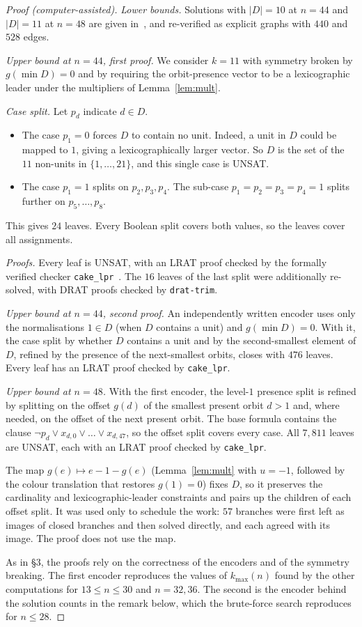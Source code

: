 \documentclass[11pt]{amsart}
\theoremstyle{definition}
\newcommand{\kmax}{k_{\max}}
\begin{document}
\begin{proof}[Proof (computer-assisted)]
\emph{Lower bounds.} Solutions with $|D|=10$ at $n=44$ and $|D|=11$ at $n=48$ are given
in~\cite{Repo}, and re-verified as explicit graphs with $440$ and $528$ edges.

\emph{Upper bound at $n=44$, first proof.} We consider $k=11$ with symmetry broken by $g(\min D)=0$ and by requiring the
orbit-presence vector to be a lexicographic leader under the multipliers of
Lemma~\ref{lem:mult}.

\emph{Case split.} Let $p_d$ indicate $d\in D$.
\begin{itemize}
\item The case $p_1=0$ forces $D$ to contain no unit. Indeed, a unit in $D$ could be mapped to
  $1$, giving a lexicographically larger vector. So $D$ is the set of the $11$ non-units in
  $\{1,\dots,21\}$, and this single case is UNSAT.
\item The case $p_1=1$ splits on $p_2,p_3,p_4$. The sub-case $p_1=p_2=p_3=p_4=1$ splits further
  on $p_5,\dots,p_8$.
\end{itemize}
This gives $24$ leaves. Every Boolean split covers both values, so the leaves cover all
assignments.

\emph{Proofs.} Every leaf is UNSAT, with an LRAT proof checked by the formally verified
checker \texttt{cake\_lpr}~\cite{cakelpr}. The $16$ leaves of the last split were additionally
re-solved, with DRAT proofs checked by \texttt{drat-trim}.

\emph{Upper bound at $n=44$, second proof.} An independently written encoder uses only the
normalisations $1\in D$ (when $D$ contains a unit) and $g(\min D)=0$. With it, the case
split by whether $D$ contains a unit and by the second-smallest element of $D$, refined by
the presence of the next-smallest orbits, closes with $476$ leaves. Every leaf has an LRAT
proof checked by \texttt{cake\_lpr}.

\emph{Upper bound at $n=48$.} With the first encoder, the level-$1$ presence split is refined
by splitting on the offset $g(d)$ of the smallest present orbit $d>1$ and, where needed, on
the offset of the next present orbit. The base formula contains the clause
$\neg p_d\vee x_{d,0}\vee\dots\vee x_{d,47}$, so the offset split covers every case.
All $7{,}811$ leaves are UNSAT, each with an LRAT proof checked by \texttt{cake\_lpr}.

The map $g(e)\mapsto e-1-g(e)$ (Lemma~\ref{lem:mult} with $u=-1$, followed by the colour
translation that restores $g(1)=0$) fixes $D$, so it preserves the cardinality and
lexicographic-leader constraints and pairs up the children of each offset split. It was used
only to schedule the work: $57$ branches were first left as images of closed branches and
then solved directly, and each agreed with its image. The proof does not use the map.

As in \S3, the proofs rely on the correctness of the encoders and of the symmetry breaking.
The first encoder reproduces the values of $\kmax(n)$ found by the other computations for
$13\le n\le30$ and $n=32,36$. The second is the encoder behind the solution counts in the
remark below, which the brute-force search reproduces for $n\le28$.
\end{proof}
\end{document}
